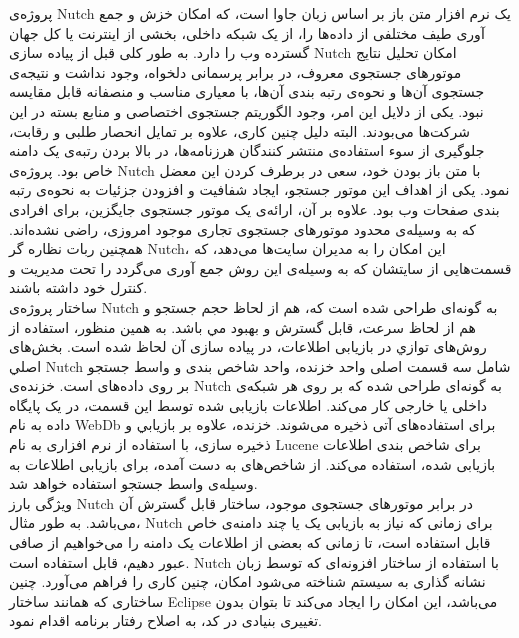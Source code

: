 
پروژه‌ی Nutch یک نرم افزار متن باز بر اساس زبان جاوا است، که امکان خزش و جمع آوری طیف مختلفی از داده‌ها را، از یک شبکه داخلی، بخشی از اینترنت یا کل جهان گسترده وب را دارد. به طور کلی قبل از پیاده سازی Nutch امکان تحلیل نتایج موتورهای جستجوی معروف، در برابر پرسمانی دلخواه، وجود نداشت و نتیجه‌ی جستجوی آن‌ها و نحوه‌ی رتبه بندی آن‌ها، با معیاری مناسب و منصفانه قابل مقایسه نبود. یکی از دلایل این امر، وجود الگوریتم جستجوی اختصاصی و منابع بسته در این شرکت‌ها می‌بودند. البته دلیل چنین کاری، علاوه بر تمایل انحصار طلبی و رقابت، جلوگیری از سوء استفاده‌ی منتشر کنندگان هرزنامه‌ها، در بالا بردن رتبه‌ی یک دامنه خاص بود. پروژه‌ی Nutch با متن باز بودن خود، سعی در برطرف کردن این معضل نمود. یکی از اهداف این موتور جستجو، ایجاد شفافیت و افزودن جزئیات به نحوه‌ی رتبه بندی صفحات وب بود. علاوه بر آن، ارائه‌ی یک موتور جستجوی جایگزین، برای افرادی که به وسیله‌ی محدود موتورهای جستجوی تجاری موجود امروزی، راضی نشده‌اند. همچنین ربات نظاره گر Nutch، این امکان را به مدیران سایت‌ها می‌دهد، که قسمت‌هایی از سایتشان که به وسیله‌ی این روش جمع آوری می‌گردد را تحت مدیریت و کنترل خود داشته باشند.
\\
ساختار پروژه‌ی Nutch به گونه‌ای طراحی شده است که، هم از لحاظ حجم جستجو و هم از لحاظ سرعت، قابل گسترش و بهبود مي باشد. به همین منظور، استفاده از روش‌های توازي  در بازیابی اطلاعات، در پیاده سازی آن لحاظ شده است. بخش‌های اصلي Nutch شامل سه قسمت اصلی واحد خزنده، واحد شاخص بندی و واسط جستجو بر روی داده‌های است. خزنده‌ی Nutch به گونه‌ای طراحی شده که بر روی هر شبکه‌ی داخلی یا خارجی کار می‌کند. اطلاعات بازیابی شده توسط این قسمت، در یک پایگاه داده به نام WebDb برای استفاده‌های آتی ذخیره می‌شوند. خزنده، علاوه بر بازيابي و ذخیره سازی، با استفاده از نرم افزاری به نام Lucene برای شاخص بندی اطلاعات بازیابی شده، استفاده می‌کند. از شاخص‌های به دست آمده، برای بازیابی اطلاعات به وسیله‌ی واسط جستجو استفاده خواهد شد.
\\
ویژگی بارز Nutch در برابر موتورهای جستجوی موجود، ساختار قابل گسترش آن می‌باشد. به طور مثال، Nutch برای زمانی که نیاز به بازیابی یک یا چند دامنه‌ی خاص قابل استفاده است، تا زمانی که بعضی از اطلاعات یک دامنه را می‌خواهیم از صافی عبور دهیم، قابل استفاده است. Nutch با استفاده از ساختار افزونه‌ای که توسط زبان نشانه گذاری به سیستم شناخته می‌شود امکان، چنین کاری را فراهم می‌آورد. چنین ساختاری که همانند ساختار Eclipse می‌باشد، این امکان را ایجاد می‌کند تا بتوان بدون تغییری بنیادی در کد، به اصلاح رفتار برنامه اقدام نمود.

